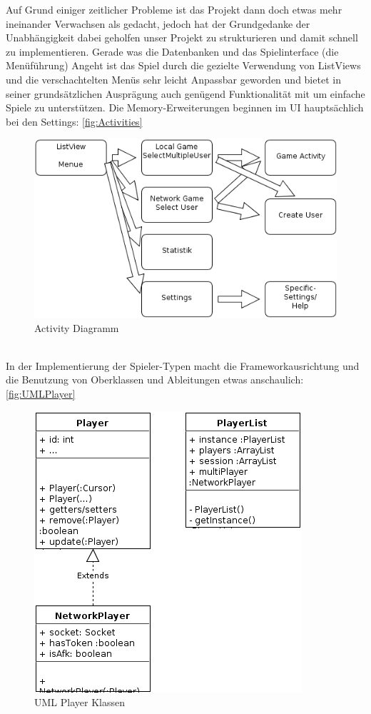 \documentclass[11pt,a4paper]{article}
\begin{document}
Auf Grund einiger zeitlicher Probleme ist das Projekt dann doch etwas mehr ineinander Verwachsen als gedacht, jedoch hat der Grundgedanke der Unabhängigkeit dabei geholfen unser Projekt zu strukturieren und damit schnell zu implementieren. Gerade was die Datenbanken und das Spielinterface (die Menüführung) Angeht ist das Spiel durch die gezielte Verwendung von ListViews und die verschachtelten Menüs sehr leicht Anpassbar geworden und bietet in seiner grundsätzlichen Ausprägung auch genügend Funktionalität mit um einfache Spiele zu unterstützen. Die Memory-Erweiterungen beginnen im UI hauptsächlich bei den Settings: \autoref{fig:Activities}
\\
\begin{figure}[!h]
\centering
\includegraphics[scale=0.5]{pics/Activities.png}
\caption{Activity Diagramm}
\label{fig:Activities}
\end{figure}\\
In der Implementierung der Spieler-Typen macht die Frameworkausrichtung und die Benutzung von Oberklassen und Ableitungen etwas anschaulich: \autoref{fig:UMLPlayer}
\\
\begin{figure}[!h]
\centering
\includegraphics[scale=0.5]{pics/UMLPlayer.png}
\caption{UML Player Klassen}
\label{fig:UMLPlayer}
\end{figure}\\
\end{document}
